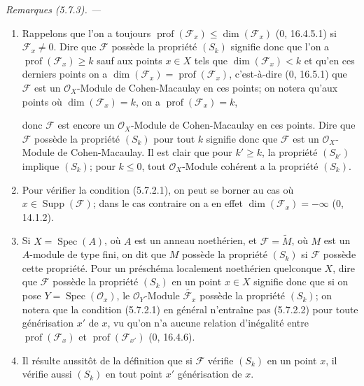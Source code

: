 \documentclass[10pt,oneside]{book}
\newcommand{\oldpage}[2][]{%
  \setcounter{footnote}{0}%
  \marginpar{\scriptsize\textbf{#1}~|~#2}\ignorespaces}
\newenvironment{remarks}[1][]{%
  \par\medskip\noindent\itshape Remarques (#1). ---\ }{\par}
\begin{document}
\begin{remarks}[5.7.3]
\label{IV.2.s5.7.3-fr}
\begin{enumerate}
\item[(i)] Rappelons que l'on a toujours
$\operatorname{prof}(\mathscr F_x)\leq\dim(\mathscr F_x)$ (0, 16.4.5.1)
si $\mathscr F_x\neq0$. Dire que $\mathscr F$ possède la propriété $(S_k)$
signifie donc que l'on a $\operatorname{prof}(\mathscr F_x)\geq k$ sauf aux
points $x\in X$ tels que $\dim(\mathscr F_x)<k$ et qu'en ces derniers points
on a $\dim(\mathscr F_x)=\operatorname{prof}(\mathscr F_x)$, c'est-à-dire
(0, 16.5.1) que $\mathscr F$ est un $\mathcal O_X$-Module de
Cohen-Macaulay en ces points; on notera qu'aux points où
$\dim(\mathscr F_x)=k$, on a $\operatorname{prof}(\mathscr F_x)=k$,

\oldpage[IV-2]{104}

donc $\mathscr F$ est encore un $\mathcal O_X$-Module de Cohen-Macaulay en
ces points. Dire que $\mathscr F$ possède la propriété $(S_k)$ pour tout
$k$ signifie donc que $\mathscr F$ est un $\mathcal O_X$-Module de
Cohen-Macaulay. Il est clair que pour $k'\geq k$, la propriété $(S_{k'})$
implique $(S_k)$; pour $k\leq0$, tout $\mathcal O_X$-Module cohérent a la
propriété $(S_k)$.

\item[(ii)] Pour vérifier la condition (5.7.2.1), on peut se borner au cas
où $x\in\operatorname{Supp}(\mathscr F)$; dans le cas contraire on a en
effet $\dim(\mathscr F_x)=-\infty$ (0, 14.1.2).

\item[(iii)] Si $X=\operatorname{Spec}(A)$, où $A$ est un anneau
noethérien, et $\mathscr F=\widetilde M$, où $M$ est un $A$-module de type
fini, on dit que $M$ possède la propriété $(S_k)$ si $\mathscr F$ possède
cette propriété. Pour un préschéma localement noethérien quelconque $X$,
dire que $\mathscr F$ possède la propriété $(S_k)$ en un point $x\in X$
signifie donc que si on pose $Y=\operatorname{Spec}(\mathcal O_x)$, le
$\mathcal O_Y$-Module $\widetilde{\mathscr F_x}$ possède la propriété
$(S_k)$; on notera que la condition (5.7.2.1) en général n'entraîne pas
(5.7.2.2) pour toute générisation $x'$ de $x$, vu qu'on n'a aucune relation
d'inégalité entre $\operatorname{prof}(\mathscr F_x)$ et
$\operatorname{prof}(\mathscr F_{x'})$ (0, 16.4.6).

\item[(iv)] Il résulte aussitôt de la définition que si $\mathscr F$ vérifie
$(S_k)$ en un point $x$, il vérifie aussi $(S_k)$ en tout point $x'$
générisation de $x$.


\end{enumerate}
\end{remarks}
\end{document}
